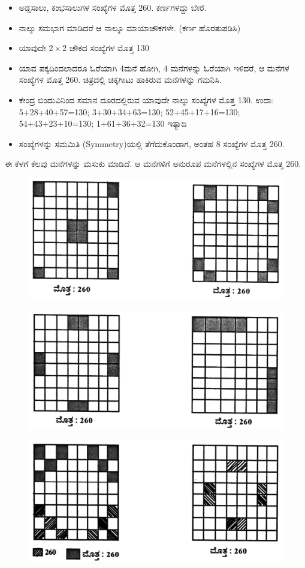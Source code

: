 \begin{itemize}
	\item ಅಡ್ಡಸಾಲು, ಕಂಭಸಾಲುಗಳ ಸಂಖ್ಯೆಗಳ ಮೊತ್ತ 260. ಕರ್ಣಗಳದ್ದು ಬೇರೆ.
	\item ನಾಲ್ಕು ಸಮಭಾಗ ಮಾಡಿದರೆ ಆ ನಾಲ್ಕೂ ಮಾಯಾಚೌಕಗಳೇ. (ಕರ್ಣ ಹೊರತುಪಡಿಸಿ)
	\item ಯಾವುದೇ $2 \times 2$ ಚೌಕದ ಸಂಖ್ಯೆಗಳ ಮೊತ್ತ 130
	\item ಯಾವ ಪಕ್ಕದಿಂದಲಾದರೂ ಓರೆಯಾಗಿ 4ಮನೆ ಹೋಗಿ, 4 ಮನೆಗಳನ್ನು ಓರೆಯಾಗಿ ಇಳಿದರೆ, ಆ ಮನೆಗಳ ಸಂಖ್ಯೆಗಳ ಮೊತ್ತ 260. ಚಿತ್ರದಲ್ಲಿ ಚಿಕ್ಕಗೀಟು ಹಾಕಿರುವ ಮನೆಗಳನ್ನು ಗಮನಿಸಿ.
	\item ಕೇಂದ್ರ ಬಿಂದುವಿನಿಂದ ಸಮಾನ ದೂರದಲ್ಲಿರುವ ಯಾವುದೇ ನಾಲ್ಕು ಸಂಖ್ಯೆಗಳ ಮೊತ್ತ 130. ಉದಾ: 5+28+40+57=130; 3+30+34+63=130; 52+45+17+16=130; 54+43+23+10=130; 1+61+36+32=130 ಇತ್ಯಾದಿ
	\item ಸಂಖ್ಯೆಗಳನ್ನು ಸಮಮಿತಿ (Symmetry)ಯಲ್ಲಿ ತೆಗೆದುಕೊಂಡಾಗ, ಅಂತಹ 8 ಸಂಖ್ಯೆಗಳ ಮೊತ್ತ 260.
\end{itemize}
ಈ ಕೆಳಗೆ ಕೆಲವು ಮನೆಗಳನ್ನು ಮಸುಕು ಮಾಡಿದೆ. ಆ ಮನೆಗಳಿಗೆ ಅನುರೂಪ ಮನೆಗಳಲ್ಲಿನ ಸಂಖ್ಯೆಗಳ ಮೊತ್ತ 260.
\begin{figure}[H]
\includegraphics{src/figures/chap7/fig7-3.jpg}
\end{figure}
\begin{figure}[H]
\includegraphics{src/figures/chap7/fig7-4.jpg}
\end{figure}
\begin{figure}[H]
\includegraphics{src/figures/chap7/fig7-5.jpg}
\end{figure}
